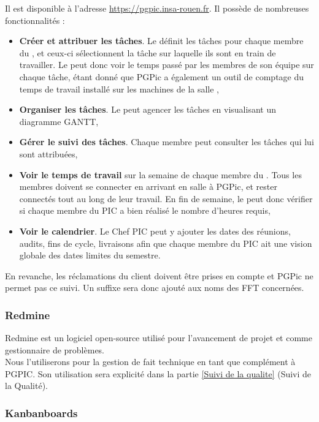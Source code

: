 Il est disponible à l’adresse \url{https://pgpic.insa-rouen.fr}. Il possède de nombreuses fonctionnalités : 
\begin{itemize}
\item \textbf{Créer et attribuer les tâches}. Le \CP{} définit les tâches pour chaque membre du \PICCourt, et ceux-ci sélectionnent la tâche sur laquelle ils sont en train de travailler. Le \CP{} peut donc voir le temps passé par les membres de son équipe sur chaque tâche, étant donné que PGPic a également un outil de comptage du temps de travail installé sur les machines de la salle \PICCourt ,
\item \textbf{Organiser les tâches}. Le \CP{} peut agencer les tâches en visualisant un diagramme GANTT,
\item \textbf{Gérer le suivi des tâches}. Chaque membre peut consulter les tâches qui lui sont attribuées,
\item \textbf{Voir le temps de travail} sur la semaine de chaque membre du \PICCourt. Tous les membres doivent se connecter en arrivant en salle \PICCourt à PGPic, et rester connectés tout au long de leur travail. En fin de semaine, le \CP{} peut donc vérifier si chaque membre du PIC a bien réalisé le nombre d’heures requis,
\item \textbf{Voir le calendrier}. Le Chef PIC peut y ajouter les dates des réunions, audits, fins de cycle, livraisons afin que chaque membre du PIC ait une vision globale des dates limites du semestre. \\ 
\end{itemize}

En revanche, les réclamations du client doivent être prises en compte et PGPic ne permet pas ce suivi. Un suffixe sera donc ajouté aux noms des FFT concernées.

\subsubsection*{Redmine}

Redmine est un logiciel open-source utilisé pour l'avancement de projet et comme gestionnaire de problèmes.\\
Nous l'utiliserons pour la gestion de fait technique en tant que complément à PGPIC. Son utilisation sera explicité dans la partie \ref{Suivi de la qualite} (Suivi de la Qualité).

\subsubsection*{Kanbanboards} 

